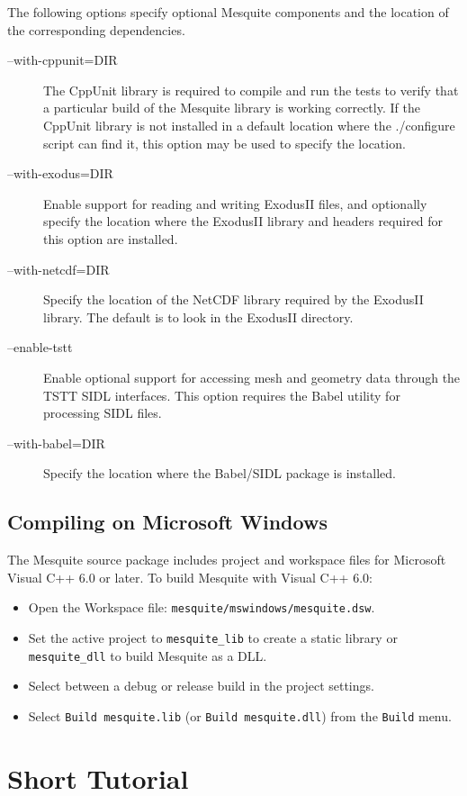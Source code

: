 The following options specify optional Mesquite components and the location 
of the corresponding dependencies.
\begin{description}
\item[--with-cppunit=DIR]  The CppUnit library is required to compile
and run the tests to verify that a particular build of the Mesquite library
is working correctly.  If the CppUnit library is not installed in a default location
where the ./configure script can find it, this option may be used to specify
the location.
\item[--with-exodus=DIR]  Enable support for reading and writing
ExodusII files, and optionally specify the location where the ExodusII library
and headers required for this option are installed.
\item[--with-netcdf=DIR]  Specify the location of the NetCDF library
required by the ExodusII library.  The default is to look in the ExodusII
directory.
\item[--enable-tstt]  Enable optional support for accessing mesh
and geometry data through the TSTT SIDL interfaces.  This option requires
the Babel utility for processing SIDL files.
\item[--with-babel=DIR]  Specify the location where the Babel/SIDL
package is installed.
\end{description}

\subsection{Compiling on Microsoft Windows}
The Mesquite source package includes project and workspace files for Microsoft Visual C++ 6.0 or later.  To build Mesquite with Visual C++ 6.0:
\begin{itemize}
\item Open the Workspace file: \texttt{mesquite/mswindows/mesquite.dsw}.
\item Set the active project to \texttt{mesquite\_lib} to create a static library or \texttt{mesquite\_dll} to build Mesquite as a DLL.
\item Select between a debug or release build in the project settings.  
\item Select \texttt{Build mesquite.lib} (or \texttt{Build mesquite.dll}) from the \texttt{Build} menu.
\end{itemize}

\section{Short Tutorial}

